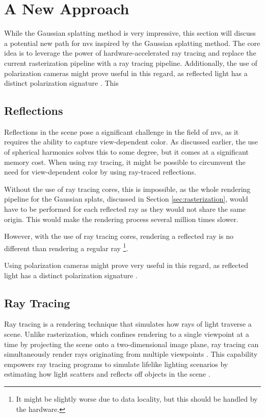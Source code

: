 \section{A New Approach}
While the Gaussian splatting method is very impressive, this section will discuss a potential new path for \gls{nvs} inspired by the Gaussian splatting method.
The core idea is to leverage the power of hardware-accelerated ray tracing and replace the current rasterization pipeline with a ray tracing pipeline.
Additionally, the use of polarization cameras might prove useful in this regard, as reflected light has a distinct polarization signature \cite{lingUniversityPhysicsVolume2016}.
This

\subsection{Reflections}
Reflections in the scene pose a significant challenge in the field of \gls{nvs}, as it requires the ability to capture view-dependent color.
As discussed earlier, the use of spherical harmonics solves this to some degree, but it comes at a significant memory cost.
When using ray tracing, it might be possible to circumvent the need for view-dependent color by using ray-traced reflections.

Without the use of ray tracing cores, this is impossible, as the whole rendering pipeline for the Gaussian splats, discussed in Section \ref{sec:rasterization}, would have to be performed for each reflected ray as they would not share the same origin.
This would make the rendering process several million times slower.

However, with the use of ray tracing cores, rendering a reflected ray is no different than rendering a regular ray \footnote{It might be slightly worse due to data locality, but this should be handled by the hardware.}.


Using polarization cameras might prove very useful in this regard, as reflected light has a distinct polarization signature \cite{lingUniversityPhysicsVolume2016}.

\subsection{Ray Tracing}
Ray tracing is a rendering technique that simulates how rays of light traverse a scene.
Unlike rasterization, which confines rendering to a single viewpoint at a time by projecting the scene onto a two-dimensional image plane, ray tracing can simultaneously render rays originating from multiple viewpoints \cite{caulfieldWhatPathTracing2022}.
This capability empowers ray tracing programs to simulate lifelike lighting scenarios by estimating how light scatters and reflects off objects in the scene \cite{caulfieldWhatPathTracing2022}.

